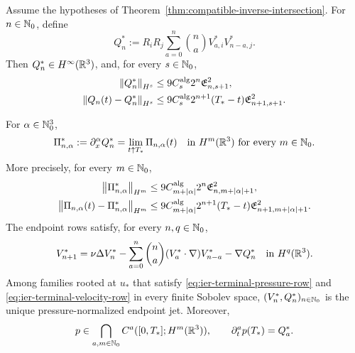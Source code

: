 \begin{theorem}
\label{thm:ier-pressure-complete-endpoint}
\begin{samepage}
Assume the hypotheses of
Theorem~\ref{thm:compatible-inverse-intersection}.
For \(n\in\mathbb N_0\), define
\begin{equation}
 Q_n^*:=R_iR_j\sum_{a=0}^{n}\binom na
 V_{a,i}^*V_{n-a,j}^*.
 \label{eq:ier-terminal-pressure-row}
\end{equation}
Then \(Q_n^*\in H^\infty(\mathbb R^3)\), and, for every \(s\in\mathbb N_0\),
\begin{align}
 \left\lVert Q_n^*\right\rVert_{H^s}
 &\le9C_s^{\rm alg}2^n\mathfrak E_{n,s+1}^2,
 \label{eq:ier-terminal-pressure-size}\\
 \left\lVert Q_n(t)-Q_n^*\right\rVert_{H^s}
 &\le9C_s^{\rm alg}2^{n+1}(T_*-t)\mathfrak E_{n+1,s+1}^2.
 \label{eq:ier-terminal-pressure-modulus}
\end{align}
\end{samepage}
For \(\alpha\in\mathbb N_0^3\),
\begin{equation}
 \Pi_{n,\alpha}^*:=\partial_x^\alpha Q_n^*
 =\lim_{t\uparrow T_*}\Pi_{n,\alpha}(t)
 \quad\text{in }H^m(\mathbb R^3)\text{ for every }m\in\mathbb N_0.
 \label{eq:ier-terminal-mixed-pressure-row}
\end{equation}
More precisely, for every \(m\in\mathbb N_0\),
\begin{align}
 \left\lVert \Pi_{n,\alpha}^*\right\rVert_{H^m}
 &\le9C_{m+|\alpha|}^{\rm alg}2^n
 \mathfrak E_{n,m+|\alpha|+1}^2,
 \label{eq:ier-terminal-mixed-pressure-size}\\
 \left\lVert \Pi_{n,\alpha}(t)-\Pi_{n,\alpha}^*\right\rVert_{H^m}
 &\le9C_{m+|\alpha|}^{\rm alg}2^{n+1}(T_*-t)
 \mathfrak E_{n+1,m+|\alpha|+1}^2.
 \label{eq:ier-terminal-mixed-pressure-modulus}
\end{align}
The endpoint rows satisfy, for every \(n,q\in\mathbb N_0\),
\begin{equation}
 V_{n+1}^*
 =\nu\Delta V_n^*
 -\sum_{a=0}^{n}\binom na(V_a^*\cdot\nabla)V_{n-a}^*
 -\nabla Q_n^*
 \quad\text{in }H^q(\mathbb R^3).
 \label{eq:ier-terminal-velocity-row}
\end{equation}
Among families rooted at \(u_*\) that satisfy
\eqref{eq:ier-terminal-pressure-row} and
\eqref{eq:ier-terminal-velocity-row} in every finite Sobolev space,
\((V_n^*,Q_n^*)_{n\in\mathbb N_0}\) is the unique pressure-normalized endpoint
jet.  Moreover,
\begin{equation}
 p\in\bigcap_{a,m\in\mathbb N_0}C^a([0,T_*];H^m(\mathbb R^3)),
 \qquad
 \partial_t^ap(T_*)=Q_a^*.
 \label{eq:ier-complete-left-pressure-jet}
\end{equation}
\end{theorem}


